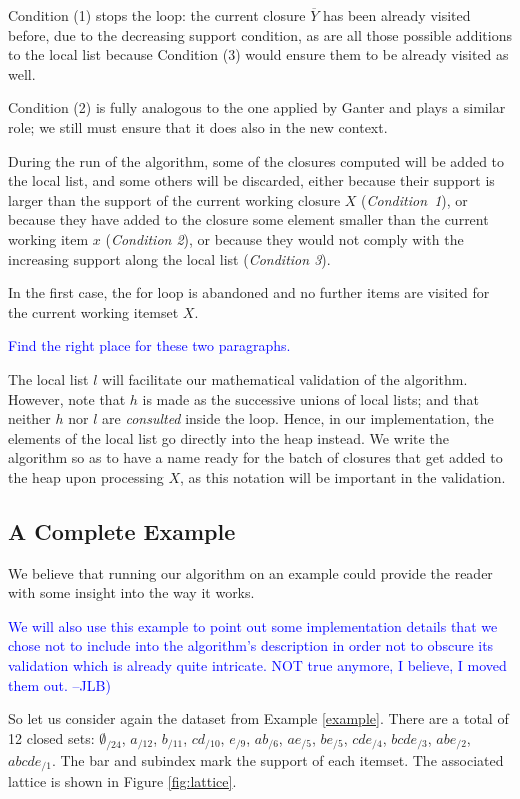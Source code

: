 \documentclass{article}
\newcommand{\added}[1]{\textcolor{blue}{#1}}
\newcommand{\cl}[1]{\overline{#1}}
\begin{document}
Condition (1) stops the loop: the current closure $\cl{Y}$ has been
already visited before, due to the decreasing support condition,
as are all those possible additions to the local list because
Condition (3) would ensure them to be already visited as well.

Condition (2) is fully analogous to the one applied by Ganter and
plays a similar role; we still must ensure that it does also in the
new context.

During the run of the algorithm, some of the closures 
computed will be added to the local list, and some others 
will be discarded, either because
% 
  their support is larger than the support of the 
  current working closure $X$ (\textsl{Condition~1}), 
or 
  because they have added to the closure some element 
  smaller than the current working item $x$ 
  (\textsl{Condition 2}), 
or
  because they would not comply with the increasing 
  support along the local list (\textsl{Condition 3}). 

In the first case, the for loop is 
abandoned and no further items are visited 
for the current working itemset $X$. 

\added{Find the right place for these two paragraphs.}

The local list $l$ will facilitate our mathematical validation
of the algorithm. However, note that $h$ is made as the successive
unions of local lists; and that neither $h$ nor $l$ are \emph{consulted}
inside the loop. Hence, in our implementation, the elements of the
local list go directly into the heap instead. We write the algorithm
so as to have a name ready for the batch of closures
that get added to the heap upon processing $X$, as this notation will
be important in the validation.

\subsection{A Complete Example}\label{sec:Example}
We believe that running our algorithm on an example could provide the 
reader with some insight into the way it works. 

\added{We will also use this example to point out some implementation 
details that we chose not to include into the algorithm's description 
in order not to obscure its validation which is already quite 
intricate. NOT true anymore, I believe, I moved them out. --JLB)}

So let us consider again the dataset from Example \ref{example}.
There are a total of 12 closed sets: $\emptyset_{/24}$, $a_{/12}$, 
$b_{/11}$, $cd_{/10}$, $e_{/9}$, $ab_{/6}$, $ae_{/5}$, $be_{/5}$, 
$cde_{/4}$, $bcde_{/3}$, $abe_{/2}$, $abcde_{/1}$. The bar and 
subindex mark the support of each itemset. The associated lattice 
is shown in Figure \ref{fig:lattice}. 
\end{document}
